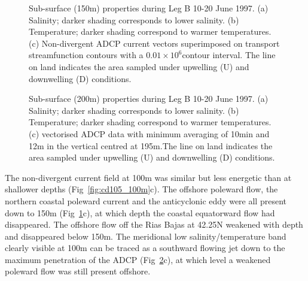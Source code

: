 %
\begin{figure}[th]
\begin{widefig}{-.5cm}{-.7cm}
\centering {}%
 
\caption{Sub-surface (150m) properties during Leg B 10-20 June
1997. (a) Salinity; darker shading corresponds to lower salinity.
(b) Temperature; darker shading correspond to warmer temperatures.
(c) Non-divergent ADCP current vectors superimposed on transport
streamfunction contours with a $0.01\times 10^{6}$\tra contour
interval. The line on land indicates the area sampled under
upwelling (U) and downwelling (D) conditions.}
\label{fig:cd105_150m}\end{widefig}\end{figure}

\begin{figure}[th]
\begin{widefig}{-.5cm}{-.7cm}
\centering {}%
 
\caption{Sub-surface (200m) properties during Leg B 10-20 June
1997. (a) Salinity; darker shading corresponds to lower salinity.
(b) Temperature; darker shading correspond to warmer temperatures.
(c) vectorised ADCP data with minimum averaging of 10min and 12m
in the vertical centred at 195m.The line on land indicates the
area sampled under upwelling (U) and downwelling (D) conditions.}
\label{fig:cd105_200m}\end{widefig}
\end{figure}

The non-divergent current field at 100m was similar but less
energetic than at shallower depths (Fig~\ref{fig:cd105_100m}c).
The offshore poleward flow, the northern coastal poleward current
and the anticyclonic eddy were all present down to 150m
(Fig~\ref{fig:cd105_150m}c), at which depth the coastal
equatorward flow had disappeared. The offshore flow off the Rias
Bajas at 42.25\deg N weakened with depth and disappeared below
150m. The meridional low salinity/temperature band clearly visible
at 100m can be traced as a southward flowing jet down to the
maximum penetration of the ADCP (Fig~\ref{fig:cd105_200m}c), at
which level a weakened poleward flow was still present offshore.

